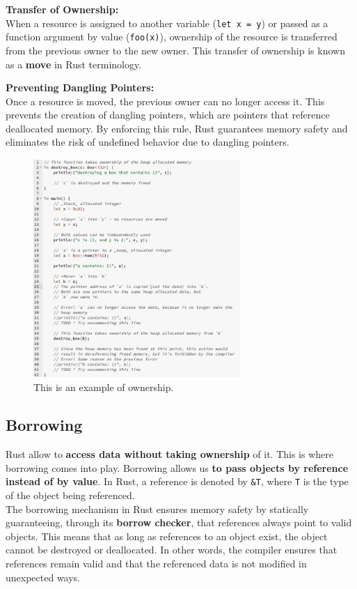 \documentclass{article}
\begin{document}
\textbf{Transfer of Ownership:} \\
When a resource is assigned to another variable (\texttt{let x = y}) or passed as a function argument by value (\texttt{foo(x)}), ownership of the resource is transferred from the previous owner to the new owner. This transfer of ownership is known as a \textbf{move} in Rust terminology.

\textbf{Preventing Dangling Pointers:} \\
Once a resource is moved, the previous owner can no longer access it. This prevents the creation of dangling pointers, which are pointers that reference deallocated memory. By enforcing this rule, Rust guarantees memory safety and eliminates the risk of undefined behavior due to dangling pointers.

\begin{figure}[h]
  \centering
  \includegraphics[width=0.7\textwidth]{images/Ownership.png} 
  \caption{This is an example of ownership.}
  \label{fig:ownership_example}
\end{figure}

\subsection{Borrowing}
Rust allow to \textbf{access data without taking ownership} of it. This is where borrowing comes into play. Borrowing allows us \textbf{to pass objects by reference instead of by value}. In Rust, a reference is denoted by \texttt{\&T}, where \texttt{T} is the type of the object being referenced.\\
The borrowing mechanism in Rust ensures memory safety by statically guaranteeing, through its \textbf{borrow checker}, that references always point to valid objects. This means that as long as references to an object exist, the object cannot be destroyed or deallocated. In other words, the compiler ensures that references remain valid and that the referenced data is not modified in unexpected ways.
\end{document}
